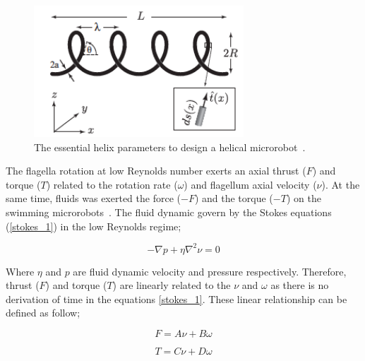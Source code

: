 \documentclass[12pt,a4paper,titlepage]{report}
\begin{document}
\begin{figure}
  \centering
    \includegraphics[width=0.7\textwidth]{parameters}
  \caption[Helix parameters]{The essential helix parameters to design a helical microrobot~\citep{rodenborn2013propulsion}.}
  \label{parameters}
\end{figure}



The flagella rotation at low Reynolds number exerts an axial thrust ($F$) and torque ($T$) related to the
rotation rate ($\omega$) and flagellum axial velocity ($\nu$). At the same time, fluids was exerted the force
 ($-F$) and the torque ($-T$) on the swimming microrobots~\citep{purcell1997efficiency}. The fluid dynamic 
govern by the Stokes equations (\ref{stokes_1}) in the low Reynolds regime;


\begin{equation}
  -\nabla{p}+ \eta\nabla^2{\nu}  = 0
\label{stokes_1}
\end{equation}

Where $\eta$ and $p$ are fluid dynamic velocity and pressure respectively. Therefore, thrust ($F$) and 
torque ($T$) are linearly related to the $\nu$ and $\omega$ as there is no derivation of time in 
the equations \ref{stokes_1}. These linear relationship can be defined as follow;



\begin{equation}
  F  = A\nu + B\omega
\label{linear1}
\end{equation}

\begin{equation}
  T = C\nu + D\omega
\label{linear2}
\end{equation}
\end{document}
